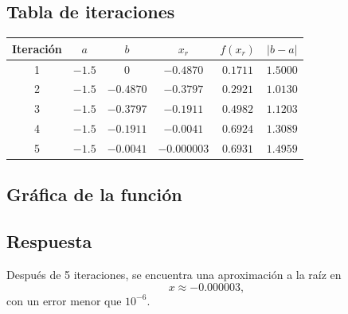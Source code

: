 \documentclass[12pt]{article}
\begin{document}
\begin{center}
\subsection*{Tabla de iteraciones}

\begin{center}
\begin{tabular}{@{}cccccc@{}}
\toprule
Iteración & \(a\)      & \(b\)        & \(x_r\)     & \(f(x_r)\) & \(\lvert b-a\rvert\) \\ 
\midrule
1         & \(-1.5\)   & \(0\)        & \(-0.4870\) & \(0.1711\) & \(1.5000\)           \\ 
2         & \(-1.5\)   & \(-0.4870\)  & \(-0.3797\) & \(0.2921\) & \(1.0130\)           \\ 
3         & \(-1.5\)   & \(-0.3797\)  & \(-0.1911\) & \(0.4982\) & \(1.1203\)           \\ 
4         & \(-1.5\)   & \(-0.1911\)  & \(-0.0041\) & \(0.6924\) & \(1.3089\)           \\ 
5         & \(-1.5\)   & \(-0.0041\)  & \(-0.000003\)& \(0.6931\)& \(1.4959\)           \\
\bottomrule
\end{tabular}
\end{center}

\subsection*{Gráfica de la función}

\begin{center}
\end{center}

\subsection*{Respuesta}

Después de 5 iteraciones, se encuentra una aproximación a la raíz en
\[
x \approx -0.000003,
\]
con un error menor que \(10^{-6}\).




\end{center}
\end{document}
